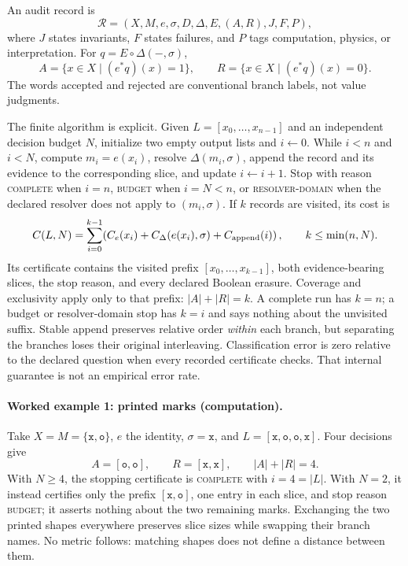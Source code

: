 An audit record is
\[
 \mathcal R=(X,M,e,\sigma,D,\Delta,E,(A,R),J,F,P),
\]
where \(J\) states invariants, \(F\) states failures, and \(P\) tags computation, physics, or interpretation.  For
\(q=E\circ\Delta(-,\sigma)\),
\[
 A=\{x\in X\mid(e^*q)(x)=1\},\qquad R=\{x\in X\mid(e^*q)(x)=0\}.
\]
The words accepted and rejected are conventional branch labels, not value judgments.

The finite algorithm is explicit.  Given \(L=[x_0,\ldots,x_{n-1}]\) and an independent decision budget \(N\),
initialize two empty output lists and \(i\leftarrow0\).  While \(i<n\) and \(i<N\), compute \(m_i=e(x_i)\), resolve
\(\Delta(m_i,\sigma)\), append the record and its evidence to the corresponding slice, and update
\(i\leftarrow i+1\).  Stop with reason \textsc{complete} when \(i=n\), \textsc{budget} when \(i=N<n\), or
\textsc{resolver-domain} when the declared resolver does not apply to \((m_i,\sigma)\).  If \(k\) records are visited,
its cost is
\[
 C(L,N)=\sum_{i=0}^{k-1}\!
 \left(C_e(x_i)+C_\Delta(e(x_i),\sigma)+C_{\rm append}(i)\right),
 \qquad k\le\min(n,N).
\]
Its certificate contains the visited prefix \([x_0,\ldots,x_{k-1}]\), both evidence-bearing slices, the stop reason,
and every declared Boolean erasure.  Coverage and exclusivity apply only to that prefix: \(|A|+|R|=k\).  A complete
run has \(k=n\); a budget or resolver-domain stop has \(k=i\) and says nothing about the unvisited suffix.  Stable
append preserves relative order \emph{within} each branch, but separating the branches loses their original
interleaving.  Classification error is zero relative to the declared question when every recorded certificate checks.
That internal guarantee is not an empirical error rate.

\paragraph{Worked example 1: printed marks (computation).}
Take \(X=M=\{\mathtt{x},\mathtt{o}\}\), \(e\) the identity, \(\sigma=\mathtt{x}\), and
\(L=[\mathtt{x},\mathtt{o},\mathtt{o},\mathtt{x}]\).  Four decisions give
\[
 A=[\mathtt{o},\mathtt{o}],\qquad R=[\mathtt{x},\mathtt{x}],
 \qquad |A|+|R|=4.
\]
With \(N\ge4\), the stopping certificate is \textsc{complete} with \(i=4=|L|\).  With \(N=2\), it instead certifies
only the prefix \([\mathtt{x},\mathtt{o}]\), one entry in each slice, and stop reason \textsc{budget}; it asserts
nothing about the two remaining marks.  Exchanging the two printed shapes everywhere preserves slice sizes while
swapping their branch names.  No metric follows: matching shapes does not define a distance between them.

